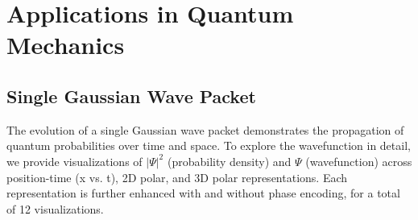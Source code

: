 \documentclass[12pt]{article}
\begin{document}





\section{Applications in Quantum Mechanics}
\label{sec:applications_in_quantum_mechanics}

\subsection{Single Gaussian Wave Packet}
The evolution of a single Gaussian wave packet demonstrates the propagation of quantum probabilities over time and space. To explore the wavefunction in detail, we provide visualizations of \(|\Psi|^2\) (probability density) and \(\Psi\) (wavefunction) across position-time (x vs. t), 2D polar, and 3D polar representations. Each representation is further enhanced with and without phase encoding, for a total of 12 visualizations.
    
\end{document}
